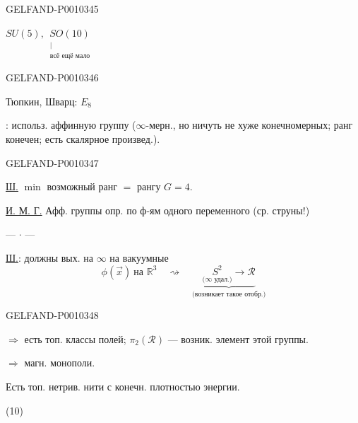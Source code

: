 \begin{GelfandAdjacentEvidence}{GELFAND-P001034}{5}

$SU(5),\ \underset{\substack{\vert\\\text{всё ещё мало}}}{SO(10)}$
\end{GelfandAdjacentEvidence}
\begin{GelfandAdjacentEvidence}{GELFAND-P001034}{6}


Тюпкин, Шварц: $E_8$

: использ. аффинную группу ($\infty$-мерн., но ничуть не хуже конечномерных;
ранг конечен; есть скалярное произвед.).
\end{GelfandAdjacentEvidence}
\begin{GelfandAdjacentEvidence}{GELFAND-P001034}{7}


\underline{Ш.} $\min$ возможный ранг $=$ рангу $G=4$.

\underline{И. М. Г.} Афф. группы опр. по ф-ям одного переменного (ср. струны!)

\begin{center}--- $\cdot$ ---\end{center}

\underline{Ш.}:  должны вых. на $\infty$ на вакуумные
\begin{equation*}
\phi(\vec x)\ \text{на }\mathbb R^3\quad\rightsquigarrow\quad
\underbrace{\underset{\text{(\(\infty\) удал.)}}{S^2}\to\mathcal R}_{\text{(возникает такое отобр.)}}
\tag{9}
\end{equation*}
\end{GelfandAdjacentEvidence}
\begin{GelfandAdjacentEvidence}{GELFAND-P001034}{8}


$\Rightarrow$ есть топ. классы полей; $\pi_2(\mathcal R)$ --- возник. элемент этой группы.

$\Rightarrow$ магн. монополи.

Есть топ. нетрив. нити с конечн. плотностью энергии.

(10)
\end{GelfandAdjacentEvidence}
